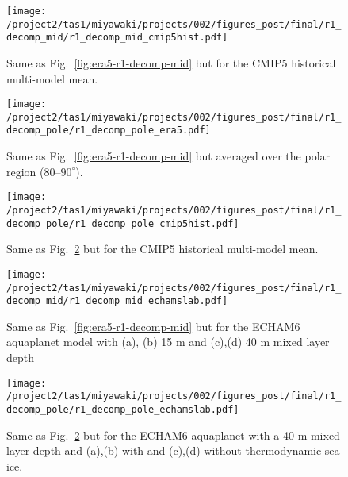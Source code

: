 \documentclass{ametsocV5}
\begin{document}
\begin{figure}[t]
  \noindent\texttt{[image: /project2/tas1/miyawaki/projects/002/figures\_post/final/r1\_decomp\_mid/r1\_decomp\_mid\_cmip5hist.pdf]}\\
  \caption{Same as Fig.~\ref{fig:era5-r1-decomp-mid} but for the CMIP5 historical multi-model mean.}
  \label{fig:cmip5hist-r1-decomp-mid}
\end{figure}

\begin{figure}[t]
  \noindent\texttt{[image: /project2/tas1/miyawaki/projects/002/figures\_post/final/r1\_decomp\_pole/r1\_decomp\_pole\_era5.pdf]}\\
  \caption{Same as Fig.~\ref{fig:era5-r1-decomp-mid} but averaged over the polar region ($80$--$90^{\circ}$).}
  \label{fig:era5-r1-decomp-pole}
\end{figure}

\begin{figure}[t]
  \noindent\texttt{[image: /project2/tas1/miyawaki/projects/002/figures\_post/final/r1\_decomp\_pole/r1\_decomp\_pole\_cmip5hist.pdf]}\\
  \caption{Same as Fig.~\ref{fig:era5-r1-decomp-pole} but for the CMIP5 historical multi-model mean.}
  \label{fig:cmip5hist-r1-decomp-pole}
\end{figure}

\begin{figure}[t]
    \noindent\texttt{[image: /project2/tas1/miyawaki/projects/002/figures\_post/final/r1\_decomp\_mid/r1\_decomp\_mid\_echamslab.pdf]}\\
    \caption{Same as Fig.~\ref{fig:era5-r1-decomp-mid} but for the ECHAM6 aquaplanet model with (a), (b) 15 m and (c),(d) 40 m mixed layer depth}
\label{fig:echam-rce}
\end{figure}

\begin{figure}[t]
    \noindent\texttt{[image: /project2/tas1/miyawaki/projects/002/figures\_post/final/r1\_decomp\_pole/r1\_decomp\_pole\_echamslab.pdf]}\\
    \caption{Same as Fig.~\ref{fig:era5-r1-decomp-pole} but for the ECHAM6 aquaplanet with a 40 m mixed layer depth and (a),(b) with and (c),(d) without thermodynamic sea ice.}
    \label{fig:echam-rae}
\end{figure}
\end{document}

